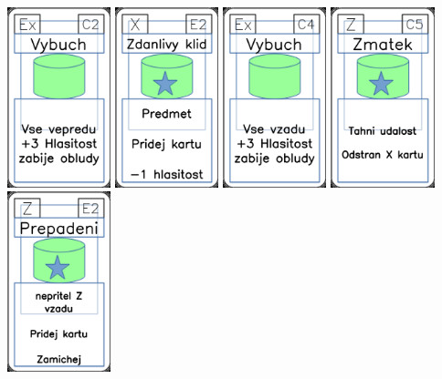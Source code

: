 \documentclass[a4paper]{article}
\begin{document}
	\includegraphics[width=3.0cm]{img-4_11}
	\includegraphics[width=3.0cm]{img-5_21}
	\includegraphics[width=3.0cm]{img-4_13}
	\includegraphics[width=3.0cm]{img-5_44}
	\includegraphics[width=3.0cm]{img-5_51}
\end{document}

